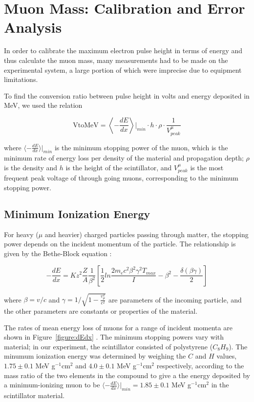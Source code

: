 
\section{Muon Mass: Calibration and Error Analysis}\label{masscalibration}

In order to calibrate the maximum electron pulse height in terms of
energy and thus calculate the muon mass, many measurements had to be
made on the experimental system, a large portion of which were
imprecise due to equipment limitations.

To find the conversion ratio between pulse height in volts and energy
deposited in MeV, we used the relation

\begin{equation} \mathrm{VtoMeV} = \left\langle -\frac{dE}{dx}\right\rangle\left.\right|_{min} \cdot h\cdot\rho\cdot\frac{1}{V_{peak}^{\mu}}\end{equation}   

where $\langle -\frac{dE}{dx}\rangle|_{min}$ is the minimum stopping
power of the muon, which is the minimum rate of energy loss per
density of the material and propagation depth; $\rho$ is the density
and $h$ is the height of the scintillator, and $V_{peak}^{\mu}$ is the
most frequent peak voltage of through going muons, corresponding to
the minimum stopping power.

\subsection{Minimum Ionization Energy}\label{minimumionizationenergy}

For heavy ($\mu$ and heavier) charged particles passing through
matter, the stopping power depends on the incident momentum of the
particle. The relationship is given by the Bethe-Block equation
\cite{yao}:

\begin{equation}
-\frac{dE}{dx} = Kz^2\frac{Z}{A}\frac{1}{\beta^2}\left[\frac{1}{2}ln\frac{2m_ec^2\beta^2\gamma^2T_{max}}{I} - \beta^2 - \frac{\delta(\beta\gamma)}{2}\right]
\end{equation}

where $\beta = v/c$ and $\gamma = 1/\sqrt{1 - \frac{v_{\mu}^2}{c^2}}$
are parameters of the incoming particle, and the other parameters are
constants or properties of the material.

The rates of mean energy loss of muons for a range of incident momenta
are shown in Figure~\ref{figure:dEdx} \cite{yao}. The minimum stopping
powers vary with material; in our experiment, the scintillator
consisted of polystyrene ($C_8H_9$). The minumum ionization energy was
determined by weighing the $C$ and $H$ values, $1.75\pm 0.1$ MeV
g$^{-1}$cm$^{2}$ and $4.0\pm 0.1$ MeV g$^{-1}$cm$^{2}$ respectively,
according to the mass ratio of the two elements in the compound to
give a the energy deposited by a minimum-ionizing muon to be $\langle
-\frac{dE}{dx}\rangle|_{min}= 1.85 \pm 0.1$ MeV g$^{-1}$cm$^{2}$ in
the scintillator material.

